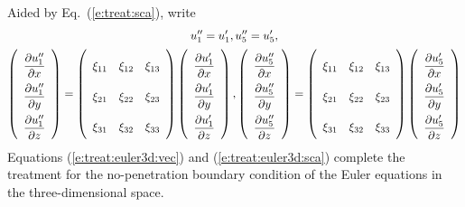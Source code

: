 \documentclass[a4paper,12pt,dvips]{article}
\begin{document}
%
Aided by Eq.~(\ref{e:treat:sca}), write
\begin{gather}
  u''_1 = u'_1, u''_5 = u'_5,
  \label{e:treat:euler3d:sca}
  \\
  \renewcommand{\arraystretch}{2.2}
  \left(\begin{array}{c}
    \dfrac{\partial u''_1}{\partial x} \\
    \dfrac{\partial u''_1}{\partial y} \\
    \dfrac{\partial u''_1}{\partial z} \\
  \end{array}\right)
  = \left(\begin{array}{ccc}
    \xi_{11} & \xi_{12} & \xi_{13} \\
    \xi_{21} & \xi_{22} & \xi_{23} \\
    \xi_{31} & \xi_{32} & \xi_{33}
  \end{array}\right)
  \left(\begin{array}{c}
    \dfrac{\partial u'_1}{\partial x} \\
    \dfrac{\partial u'_1}{\partial y} \\
    \dfrac{\partial u'_1}{\partial z} \\
  \end{array}\right),
  \left(\begin{array}{c}
    \dfrac{\partial u''_5}{\partial x} \\
    \dfrac{\partial u''_5}{\partial y} \\
    \dfrac{\partial u''_5}{\partial z} \\
  \end{array}\right)
  = \left(\begin{array}{ccc}
    \xi_{11} & \xi_{12} & \xi_{13} \\
    \xi_{21} & \xi_{22} & \xi_{23} \\
    \xi_{31} & \xi_{32} & \xi_{33}
  \end{array}\right)
  \left(\begin{array}{c}
    \dfrac{\partial u'_5}{\partial x} \\
    \dfrac{\partial u'_5}{\partial y} \\
    \dfrac{\partial u'_5}{\partial z} \\
  \end{array}\right)
  \notag
\end{gather}
%
Equations (\ref{e:treat:euler3d:vec}) and (\ref{e:treat:euler3d:sca}) complete
the treatment for the no-penetration boundary condition of the Euler equations
in the three-dimensional space.
\end{document}
